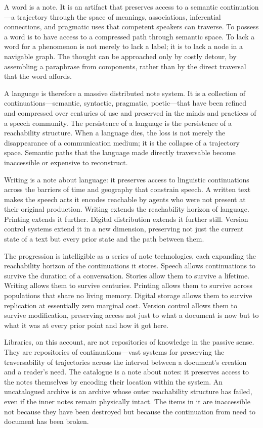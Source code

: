 \documentclass[12pt, a4paper]{article}
\begin{document}
A word is a note. It is an artifact that preserves access to a semantic
continuation---a trajectory through the space of meanings, associations,
inferential connections, and pragmatic uses that competent speakers can traverse.
To possess a word is to have access to a compressed path through semantic space.
To lack a word for a phenomenon is not merely to lack a label; it is to lack a
node in a navigable graph. The thought can be approached only by costly detour, by
assembling a paraphrase from components, rather than by the direct traversal that
the word affords.

A language is therefore a massive distributed note system. It is a collection of
continuations---semantic, syntactic, pragmatic, poetic---that have been refined
and compressed over centuries of use and preserved in the minds and practices of a
speech community. The persistence of a language is the persistence of a
reachability structure. When a language dies, the loss is not merely the
disappearance of a communication medium; it is the collapse of a trajectory space.
Semantic paths that the language made directly traversable become inaccessible or
expensive to reconstruct.

Writing is a note about language: it preserves access to linguistic continuations
across the barriers of time and geography that constrain speech. A written text
makes the speech acts it encodes reachable by agents who were not present at their
original production. Writing extends the reachability horizon of language.
Printing extends it further. Digital distribution extends it further still.
Version control systems extend it in a new dimension, preserving not just the
current state of a text but every prior state and the path between them.

The progression is intelligible as a series of note technologies, each expanding
the reachability horizon of the continuations it stores. Speech allows
continuations to survive the duration of a conversation. Stories allow them to
survive a lifetime. Writing allows them to survive centuries. Printing allows them
to survive across populations that share no living memory. Digital storage allows
them to survive replication at essentially zero marginal cost. Version control
allows them to survive modification, preserving access not just to what a document
is now but to what it was at every prior point and how it got here.

Libraries, on this account, are not repositories of knowledge in the passive
sense. They are repositories of continuations---vast systems for preserving the
traversability of trajectories across the interval between a document's creation
and a reader's need. The catalogue is a note about notes: it preserves access to
the notes themselves by encoding their location within the system. An uncatalogued
archive is an archive whose outer reachability structure has failed, even if the
inner notes remain physically intact. The items in it are inaccessible not because
they have been destroyed but because the continuation from need to document has
been broken.
\end{document}
